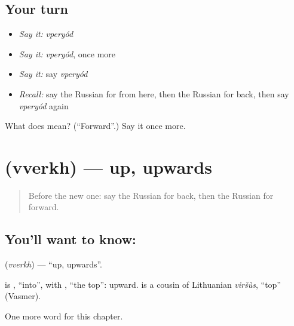 \subsection*{Your turn}
\begin{itemize}
\raggedright
  \item \emph{Say it:} \emph{vperyód}
  \item \emph{Say it:} \emph{vperyód}, once more
  \item \emph{Say it:} say \emph{vperyód}
  \item \emph{Recall:} say the Russian for from here, then the Russian for back, then say \emph{vperyód} again
\end{itemize}

\begin{tcolorbox}[breakable,colback=teal!4,colframe=teal!35!black,title={Before you move on}]
What does  mean? (\textquotedblleft{}Forward\textquotedblright{}.) Say it once more.
\end{tcolorbox}
\section[\texorpdfstring{\ru{вверх} (vverkh)}{вверх (vverkh)}]{ (vverkh) — up, upwards}

\label{lesson:RU-C214-vverkh}



\begin{quote}
Before the new one: say the Russian for back, then the Russian for forward.
\end{quote}

\subsection*{You'll want to know: }
\textbf{} (\emph{vverkh}) — \textquotedblleft{}up, upwards\textquotedblright{}.

\begin{cousinweb}
\textbf{} is \emph{}, \textquotedblleft{}into\textquotedblright{}, with \emph{}, \textquotedblleft{}the top\textquotedblright{}: upward. \emph{} is a cousin of Lithuanian \emph{viršùs}, \textquotedblleft{}top\textquotedblright{} (Vasmer).
\end{cousinweb}

\begin{grammarlens}[title={What you've built}]
One more word for this chapter.
\end{grammarlens}

